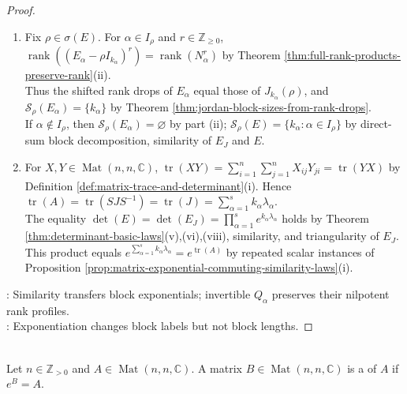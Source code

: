 \begin{theorem}
\begin{proof}
\begin{enumerate}[label=(\roman*)]
\item Fix $\rho\in\sigma(E)$. For $\alpha\in I_{\rho}$ and $r\in\mathbb{Z}_{\geq0}$, $\operatorname{rank}((E_{\alpha}-\rho I_{k_{\alpha}})^r)=\operatorname{rank}(N_{\alpha}^r)$ by Theorem \ref{thm:full-rank-products-preserve-rank}(ii).\\
Thus the shifted rank drops of $E_{\alpha}$ equal those of $J_{k_{\alpha}}(\rho)$, and $\mathcal{S}_{\rho}(E_{\alpha})=\{k_{\alpha}\}$ by Theorem \ref{thm:jordan-block-sizes-from-rank-drops}.\\
If $\alpha\notin I_{\rho}$, then $\mathcal{S}_{\rho}(E_{\alpha})=\varnothing$ by part (ii); $\mathcal{S}_{\rho}(E)=\{k_{\alpha}:\alpha\in I_{\rho}\}$ by direct-sum block decomposition, similarity of $E_J$ and $E$.
\item For $X,Y\in\operatorname{Mat}(n,n,\mathbb{C})$, $\operatorname{tr}(XY)=\sum\limits_{i=1}^n\sum\limits_{j=1}^nX_{ij}Y_{ji}=\operatorname{tr}(YX)$ by Definition \ref{def:matrix-trace-and-determinant}(i). Hence $\operatorname{tr}(A)=\operatorname{tr}(SJS^{-1})=\operatorname{tr}(J)=\sum\limits_{\alpha=1}^sk_{\alpha}\lambda_{\alpha}$.\\
The equality $\det(E)=\det(E_J)=\prod\limits_{\alpha=1}^se^{k_{\alpha}\lambda_{\alpha}}$ holds by Theorem \ref{thm:determinant-basic-laws}(v),(vi),(viii), similarity, and triangularity of $E_J$.\\
This product equals $e^{\sum\limits_{\alpha=1}^sk_{\alpha}\lambda_{\alpha}}=e^{\operatorname{tr}(A)}$ by repeated scalar instances of Proposition \ref{prop:matrix-exponential-commuting-similarity-laws}(i).
\end{enumerate}
: Similarity transfers block exponentials; invertible $Q_{\alpha}$ preserves their nilpotent rank profiles.\\
: Exponentiation changes block labels but not block lengths.
\end{proof}
\end{theorem}

\begin{definition} \label{def:complex-matrix-logarithm} \\
Let $n\in\mathbb{Z}_{>0}$ and $A\in\operatorname{Mat}(n,n,\mathbb{C})$. A matrix $B\in\operatorname{Mat}(n,n,\mathbb{C})$ is a  of $A$ if $e^B=A$.
\end{definition}

